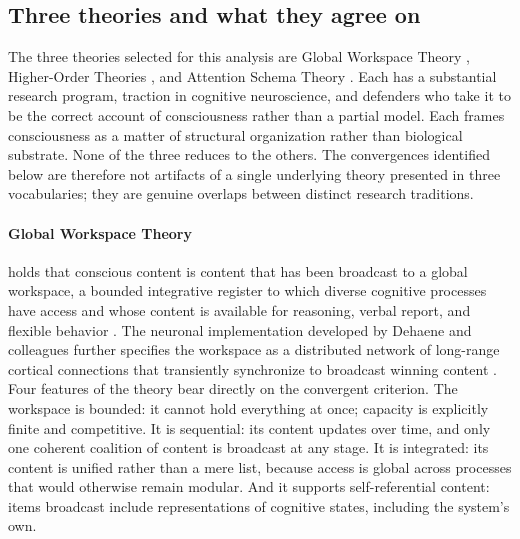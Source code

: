 \documentclass[11pt]{article}
\theoremstyle{foundation}
\begin{document}
\subsection{Three theories and what they agree on}

The three theories selected for this analysis are Global Workspace Theory \citep{Baars1988, DehaeneChangeux2011, Dehaene2014}, Higher-Order Theories \citep{Rosenthal2005, LauRosenthal2011}, and Attention Schema Theory \citep{Graziano2013, Graziano2019}. Each has a substantial research program, traction in cognitive neuroscience, and defenders who take it to be the correct account of consciousness rather than a partial model. Each frames consciousness as a matter of structural organization rather than biological substrate. None of the three reduces to the others. The convergences identified below are therefore not artifacts of a single underlying theory presented in three vocabularies; they are genuine overlaps between distinct research traditions.

\paragraph{Global Workspace Theory} holds that conscious content is content that has been broadcast to a global workspace, a bounded integrative register to which diverse cognitive processes have access and whose content is available for reasoning, verbal report, and flexible behavior \citep{Baars1988}. The neuronal implementation developed by Dehaene and colleagues further specifies the workspace as a distributed network of long-range cortical connections that transiently synchronize to broadcast winning content \citep{DehaeneChangeux2011, Dehaene2014}. Four features of the theory bear directly on the convergent criterion. The workspace is bounded: it cannot hold everything at once; capacity is explicitly finite and competitive. It is sequential: its content updates over time, and only one coherent coalition of content is broadcast at any stage. It is integrated: its content is unified rather than a mere list, because access is global across processes that would otherwise remain modular. And it supports self-referential content: items broadcast include representations of cognitive states, including the system's own.
\end{document}
